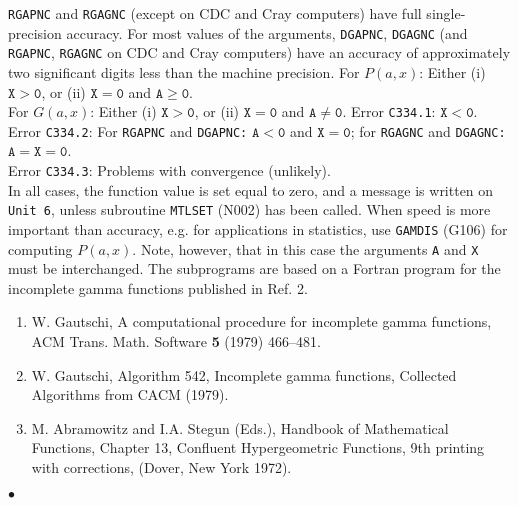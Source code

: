{\tt RGAPNC} and {\tt RGAGNC} (except on CDC and Cray computers)
have full single-precision accuracy.
For most values of the arguments, {\tt DGAPNC}, {\tt DGAGNC}
(and {\tt RGAPNC}, {\tt RGAGNC} on CDC and Cray computers) have an
accuracy of
approximately two significant digits less than the machine precision.
\Restrict
For $P(a,x)$: Either (i) $\mathtt{X > 0}$, or (ii) $\mathtt{X = 0}$ and
$\mathtt{A \ge 0}$. \\
For $G(a,x)$: Either (i) $\mathtt{X > 0}$, or (ii) $\mathtt{X = 0}$ and
$\mathtt{A \ne 0}$.
\newpage
\Errorh
Error {\tt C334.1}: $\mathtt{X<0}$. \\
Error {\tt C334.2}: For {\tt RGAPNC} and {\tt DGAPNC:}
$\mathtt{A<0}$ and $\mathtt{X=0}$;
for {\tt RGAGNC} and {\tt DGAGNC:} $\mathtt{A=X=0}$. \\
Error {\tt C334.3}: Problems with convergence (unlikely). \\
In all cases,
the function value is set equal to zero, and a message is written on
{\tt Unit 6}, unless subroutine {\tt MTLSET} (N002) has been called.
\Notes
When speed is more important than accuracy, e.g. for applications in
statistics, use {\tt GAMDIS} (G106) for computing $ P(a,x)$.
Note, however, that in this case the arguments {\tt A} and {\tt X} must
be interchanged.
\Source
The subprograms are based on a Fortran program for the incomplete
gamma functions published in Ref. 2.
\Refer
\begin{enumerate}
\item W. Gautschi, A computational procedure for incomplete gamma
functions, ACM Trans. Math. Software {\bf 5} (1979) 466--481.
\item W. Gautschi, Algorithm 542, Incomplete gamma functions,
Collected Algorithms from CACM (1979).
\item  M. Abramowitz and I.A. Stegun (Eds.), Handbook
of Mathematical Functions, Chapter 13, Confluent Hypergeometric
Functions, 9th printing with corrections, (Dover, New York 1972).
\end{enumerate}
$\bullet$
